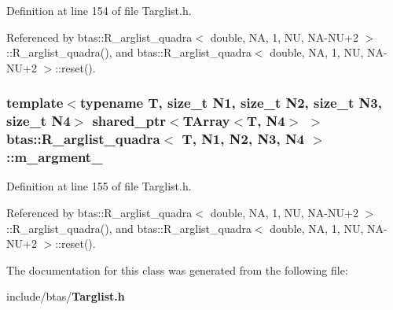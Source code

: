 Definition at line 154 of file Targlist.\-h.



Referenced by btas\-::\-R\-\_\-arglist\-\_\-quadra$<$ double, N\-A, 1, N\-U, N\-A-\/\-N\-U+2 $>$\-::\-R\-\_\-arglist\-\_\-quadra(), and btas\-::\-R\-\_\-arglist\-\_\-quadra$<$ double, N\-A, 1, N\-U, N\-A-\/\-N\-U+2 $>$\-::reset().

\subsubsection[{m\-\_\-argment\-\_\-4}]{\setlength{\rightskip}{0pt plus 5cm}template$<$typename T, size\-\_\-t N1, size\-\_\-t N2, size\-\_\-t N3, size\-\_\-t N4$>$ shared\-\_\-ptr$<${\bf T\-Array}$<$T, N4$>$ $>$ {\bf btas\-::\-R\-\_\-arglist\-\_\-quadra}$<$ T, N1, N2, N3, N4 $>$\-::m\-\_\-argment\-\_\hspace{0.3cm}{\ttfamily [protected]}}\label{d4/dec/classbtas_1_1R__arglist__quadra_a933e9bb46c373bc1da02594338d5bf81}


Definition at line 155 of file Targlist.\-h.



Referenced by btas\-::\-R\-\_\-arglist\-\_\-quadra$<$ double, N\-A, 1, N\-U, N\-A-\/\-N\-U+2 $>$\-::\-R\-\_\-arglist\-\_\-quadra(), and btas\-::\-R\-\_\-arglist\-\_\-quadra$<$ double, N\-A, 1, N\-U, N\-A-\/\-N\-U+2 $>$\-::reset().



The documentation for this class was generated from the following file\-:\begin{DoxyCompactItemize}
\item 
include/btas/{\bf Targlist.\-h}\end{DoxyCompactItemize}
